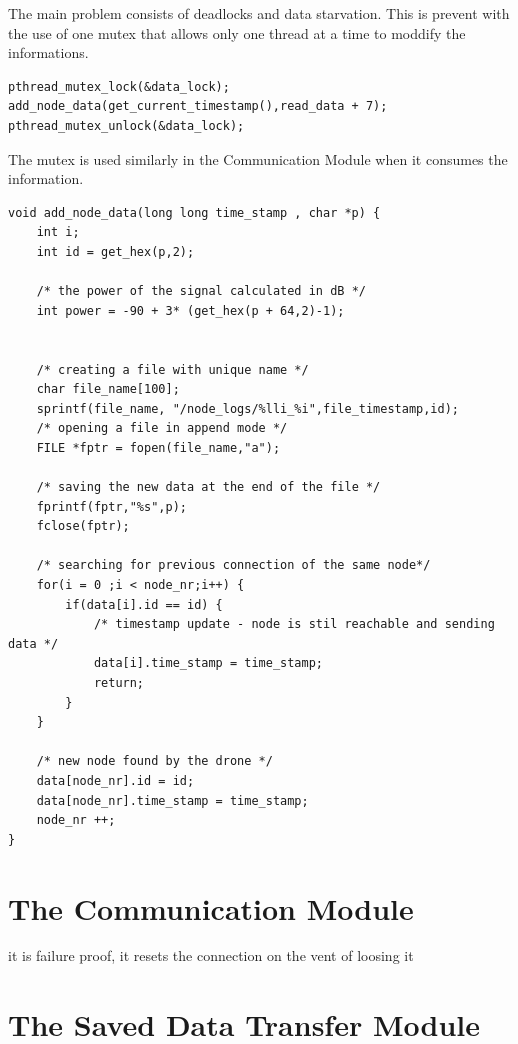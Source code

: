 The main problem consists of deadlocks and data starvation. This is prevent with the use of one mutex that allows only one thread at a time to moddify the informations.

\lstset{numbers=none, mathescape=true, nolol=false,caption=Data Collection use of mutex,label=lst:task}
\begin{lstlisting}
pthread_mutex_lock(&data_lock); 
add_node_data(get_current_timestamp(),read_data + 7);
pthread_mutex_unlock(&data_lock);
\end{lstlisting}

The mutex is used similarly in the Communication Module when it consumes the information.

\lstset{numbers=none, mathescape=true, nolol=false,caption=Data Collection use of mutex,label=lst:task}
\begin{lstlisting}
void add_node_data(long long time_stamp , char *p) {
	int i;
	int id = get_hex(p,2);

	/* the power of the signal calculated in dB */	
	int power = -90 + 3* (get_hex(p + 64,2)-1);


	/* creating a file with unique name */
	char file_name[100];
	sprintf(file_name, "/node_logs/%lli_%i",file_timestamp,id);
	/* opening a file in append mode */	
	FILE *fptr = fopen(file_name,"a");
	
	/* saving the new data at the end of the file */
	fprintf(fptr,"%s",p);
	fclose(fptr);
	
	/* searching for previous connection of the same node*/
	for(i = 0 ;i < node_nr;i++) {
		if(data[i].id == id) {
			/* timestamp update - node is stil reachable and sending data */
			data[i].time_stamp = time_stamp;
			return;
		}
	}

	/* new node found by the drone */
	data[node_nr].id = id;
	data[node_nr].time_stamp = time_stamp;
	node_nr ++;
}

\end{lstlisting}


\clearpage

\section{The Communication Module}

it is failure proof, it resets the connection on the vent of loosing it
\clearpage

\section{The Saved Data Transfer Module}
